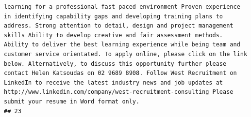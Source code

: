 \documentclass[11pt,a4paper,]{article}
\begin{document}
\begin{verbatim}
learning for a professional fast paced environment Proven experience in identifying capability gaps and developing training plans to address. Strong attention to detail, design and project management skills Ability to develop creative and fair assessment methods. Ability to deliver the best learning experience while being team and customer service orientated. To apply online, please click on the link below. Alternatively, to discuss this opportunity further please contact Helen Katsoudas on 02 9689 8908. Follow West Recruitment on LinkedIn to receive the latest industry news and job updates at http://www.linkedin.com/company/west-recruitment-consulting Please submit your resume in Word format only.
## 23                                                                                                                                                                                                                                                                                                                                                                                                                                                                                                                                                                                                                                                                                                                                                                                                                                                                                                                                                                                                                                                                                                                                                                                                                                                                                                                                                                                                                                                                                                                                                                                                                                                                                                                                                                                                                                                                                                                                                                                                                                                                                                                                                                                                                                                                                                                                                                                                                                                                                                                                                                                                                                                                                                              
\end{verbatim}
\end{document}
